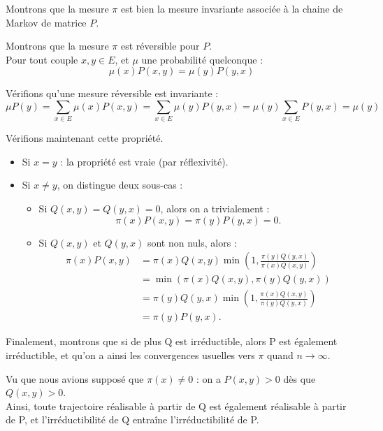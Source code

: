 \documentclass{article}
\begin{document}
Montrons que la mesure $\pi$ est bien la mesure invariante associée à la chaine de Markov de matrice $P$. \\

\begin{tcolorbox}[colback=white,colframe=green!80!black,title=Démonstration (suite)]

Montrons que la mesure $\pi$ est réversible pour $P$. \\
Pour tout couple $x, y \in E$, et $\mu$ une probabilité quelconque :
\[
    \mu(x)P(x, y) = \mu(y) P(y, x)
\]

Vérifions qu'une mesure réversible est invariante :
\[
\mu P(y) = \sum_{x \in E}{\mu(x) P(x, y)} = \sum_{x \in E}{\mu(y) P(y, x)} = \mu(y) \sum_{x \in E}{P(y, x)} = \mu(y)
\]

Vérifions maintenant cette propriété.
\begin{itemize}
    \item Si $x = y$ : la propriété est vraie (par réflexivité).
    \item Si $x \neq y$, on distingue deux sous-cas :
        \begin{itemize}
            \item Si $Q(x, y) = Q(y, x) = 0$, alors on a trivialement :
            \[
                \pi(x)P(x, y) = \pi(y)P(y, x) = 0.
            \]
            \item Si $Q(x, y)$ et $Q(y, x)$ sont non nuls, alors :
            \begin{align*}
                \pi(x)P(x, y) 
                &= \pi(x)Q(x, y)\min\left(1, \frac{\pi(y)Q(y, x)}{\pi(x)Q(x, y)}\right) \\
                &= \min\left(\pi(x)Q(x, y), \pi(y)Q(y, x)\right) \\
                &= \pi(y)Q(y, x)\min\left(1, \frac{\pi(x)Q(x, y)}{\pi(y)Q(y, x)}\right) \\
                &= \pi(y)P(y, x).
            \end{align*}
        \end{itemize}
\end{itemize}
\end{tcolorbox}

Finalement, montrons que si de plus Q est irréductible, alors P est également irréductible, et qu'on a ainsi les convergences usuelles vers $\pi$ quand $n \rightarrow \infty$. \\

\begin{tcolorbox}[colback=white,colframe=green!80!black,title=Démonstration (conclusion)]

Vu que nous avions supposé que $\pi(x) \neq 0$ : on a $P(x, y) > 0$ dès que $Q(x, y) > 0$. \\

Ainsi, toute trajectoire réalisable à partir de Q est également réalisable à partir de P, et l'irréductibilité de Q entraîne l'irréductibilité de P.
\end{tcolorbox}
\end{document}

